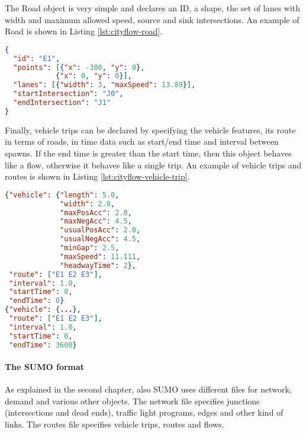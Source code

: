The Road object is very simple and declares an ID, a shape, the set of lanes with width and maximum allowed speed, source and sink intersections.
An example of Road is shown in Listing \ref{lst:cityflow-road}.

\noindent
\begin{minipage}{\linewidth}
\begin{lstlisting}[language=JSON, caption=Example of road declaration in CityFlow format, label={lst:cityflow-road}]
{
  "id": "E1",
  "points": [{"x": -300, "y": 0},
            {"x": 0, "y": 0}],
  "lanes": [{"width": 3, "maxSpeed": 13.89}],
  "startIntersection": "J0",
  "endIntersection": "J1"
}
\end{lstlisting}
\end{minipage}

Finally, vehicle trips can be declared by specifying the vehicle features, its route in terms of roads, in time data such as start/end time and interval between spawns. If the end time is greater than the start time, then this object behaves like a flow, otherwise it behaves like a single trip.
An example of vehicle trips and routes is shown in Listing \ref{lst:cityflow-vehicle-trip}.

\noindent
\begin{minipage}{\linewidth}
\begin{lstlisting}[language=JSON, caption=Example of vehicle trip and route declaration in CityFlow format, label={lst:cityflow-vehicle-trip}]
{"vehicle": {"length": 5.0,
             "width": 2.0,
             "maxPosAcc": 2.0,
             "maxNegAcc": 4.5,
             "usualPosAcc": 2.0,
             "usualNegAcc": 4.5,
             "minGap": 2.5,
             "maxSpeed": 11.111,
             "headwayTime": 2},
 "route": ["E1 E2 E3"],
 "interval": 1.0,
 "startTime": 0,
 "endTime": 0}
{"vehicle": {...},
 "route": ["E1 E2 E3"],
 "interval": 1.0,
 "startTime": 0,
 "endTime": 3600}
\end{lstlisting}
\end{minipage}

\paragraph{The SUMO format}

As explained in the second chapter, also SUMO uses different files for network, demand and various other objects.
The network file specifies junctions (intersections and dead ends), traffic light programs, edges and other kind of links.
The routes file specifies vehicle trips, routes and flows.

